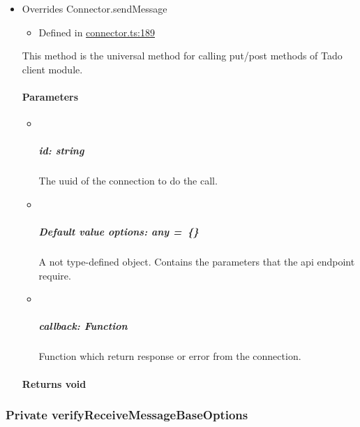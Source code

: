 \documentclass[]{article}
\providecommand{\tightlist}{%
  \setlength{\itemsep}{0pt}\setlength{\parskip}{0pt}}
\let\oldparagraph\paragraph
\renewcommand{\paragraph}[1]{\oldparagraph{#1}\mbox{}}
\let\oldsubparagraph\subparagraph
\renewcommand{\subparagraph}[1]{\oldsubparagraph{#1}\mbox{}}
\begin{document}
\begin{itemize}
\item
  Overrides Connector.sendMessage

  \begin{itemize}
  \tightlist
  \item
    Defined in
    \href{https://github.com/BFMBFramework/TadoConnector/blob/f05932b/src/connector.ts\#L189}{connector.ts:189}
  \end{itemize}

  This method is the universal method for calling put/post methods of
  Tado client module.

  \hypertarget{parameters-8}{%
  \paragraph{Parameters}\label{parameters-8}}

  \begin{itemize}
  \item ~
    \hypertarget{id-string-5}{%
    \subparagraph{\texorpdfstring{id:
    {string}}{id: string}}\label{id-string-5}}

    The uuid of the connection to do the call.
  \item ~
    \hypertarget{default-value-options-any-2}{%
    \subparagraph{\texorpdfstring{{Default value} options: {any}{
    =~\{\}}}{Default value options: any =~\{\}}}\label{default-value-options-any-2}}

    A not type-defined object. Contains the parameters that the api
    endpoint require.
  \item ~
    \hypertarget{callback-function-6}{%
    \subparagraph{\texorpdfstring{callback:
    {Function}}{callback: Function}}\label{callback-function-6}}

    Function which return response or error from the connection.
  \end{itemize}

  \hypertarget{returns-void-6}{%
  \paragraph{\texorpdfstring{Returns
  {void}}{Returns void}}\label{returns-void-6}}
\end{itemize}

\protect\hypertarget{verifyreceivemessagebaseoptions}{}{}

\hypertarget{private-verifyreceivemessagebaseoptions}{%
\subsubsection{\texorpdfstring{{Private}
verifyReceiveMessageBaseOptions}{Private verifyReceiveMessageBaseOptions}}\label{private-verifyreceivemessagebaseoptions}}
\end{document}
